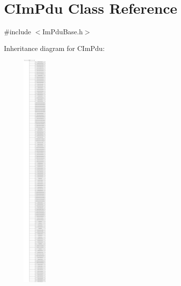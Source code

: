 \hypertarget{class_c_im_pdu}{}\section{C\+Im\+Pdu Class Reference}
\label{class_c_im_pdu}


{\ttfamily \#include $<$Im\+Pdu\+Base.\+h$>$}

Inheritance diagram for C\+Im\+Pdu\+:\begin{figure}[H]
\begin{center}
\leavevmode
\includegraphics[height=12.000000cm]{class_c_im_pdu}
\end{center}
\end{figure}
